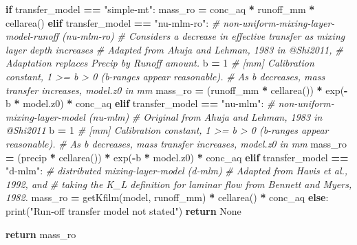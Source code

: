 \documentclass[]{article}
\newenvironment{Shaded}{\begin{snugshade}}{\end{snugshade}}
\newcommand{\DecValTok}[1]{\textcolor[rgb]{0.00,0.00,0.81}{{#1}}}
\newcommand{\StringTok}[1]{\textcolor[rgb]{0.31,0.60,0.02}{{#1}}}
\newcommand{\CommentTok}[1]{\textcolor[rgb]{0.56,0.35,0.01}{\textit{{#1}}}}
\newcommand{\VariableTok}[1]{\textcolor[rgb]{0.00,0.00,0.00}{{#1}}}
\newcommand{\ControlFlowTok}[1]{\textcolor[rgb]{0.13,0.29,0.53}{\textbf{{#1}}}}
\newcommand{\OperatorTok}[1]{\textcolor[rgb]{0.81,0.36,0.00}{\textbf{{#1}}}}
\newcommand{\BuiltInTok}[1]{{#1}}
\newcommand{\NormalTok}[1]{{#1}}
\begin{document}
\begin{Shaded}
\begin{Highlighting}[]
    \ControlFlowTok{if} \NormalTok{transfer_model }\OperatorTok{==} \StringTok{"simple-mt"}\NormalTok{:}
        \NormalTok{mass_ro }\OperatorTok{=} \NormalTok{conc_aq }\OperatorTok{*} \NormalTok{runoff_mm }\OperatorTok{*} \NormalTok{cellarea()}
    \ControlFlowTok{elif} \NormalTok{transfer_model }\OperatorTok{==} \StringTok{"nu-mlm-ro"}\NormalTok{:}
        \CommentTok{# non-uniform-mixing-layer-model-runoff (nu-mlm-ro)}
        \CommentTok{# Considers a decrease in effective transfer as mixing layer depth increases}
        \CommentTok{# Adapted from Ahuja and Lehman, 1983 in @Shi2011,}
        \CommentTok{# Adaptation replaces Precip by Runoff amount.}
        \NormalTok{b }\OperatorTok{=} \DecValTok{1}  \CommentTok{# [mm] Calibration constant, 1 >= b > 0 (b-ranges appear reasonable).}
        \CommentTok{# As b decreases, mass transfer increases, model.z0 in mm}
        \NormalTok{mass_ro }\OperatorTok{=} \NormalTok{(runoff_mm }\OperatorTok{*} \NormalTok{cellarea()) }\OperatorTok{*} \NormalTok{exp(}\OperatorTok{-}\NormalTok{b }\OperatorTok{*} \NormalTok{model.z0) }\OperatorTok{*} \NormalTok{conc_aq }
    \ControlFlowTok{elif} \NormalTok{transfer_model }\OperatorTok{==} \StringTok{"nu-mlm"}\NormalTok{:}
        \CommentTok{# non-uniform-mixing-layer-model (nu-mlm)}
        \CommentTok{# Original from Ahuja and Lehman, 1983 in @Shi2011}
        \NormalTok{b }\OperatorTok{=} \DecValTok{1}  \CommentTok{# [mm] Calibration constant, 1 >= b > 0 (b-ranges appear reasonable).}
        \CommentTok{# As b decreases, mass transfer increases, model.z0 in mm}
        \NormalTok{mass_ro }\OperatorTok{=} \NormalTok{(precip }\OperatorTok{*} \NormalTok{cellarea()) }\OperatorTok{*} \NormalTok{exp(}\OperatorTok{-}\NormalTok{b }\OperatorTok{*} \NormalTok{model.z0) }\OperatorTok{*} \NormalTok{conc_aq}
    \ControlFlowTok{elif} \NormalTok{transfer_model }\OperatorTok{==} \StringTok{"d-mlm"}\NormalTok{:}
        \CommentTok{# distributed mixing-layer-model (d-mlm)}
        \CommentTok{# Adapted from Havis et al., 1992, and}
        \CommentTok{# taking the K_L definition for laminar flow from Bennett and Myers, 1982.}
        \NormalTok{mass_ro }\OperatorTok{=} \NormalTok{getKfilm(model, runoff_mm) }\OperatorTok{*} \NormalTok{cellarea() }\OperatorTok{*} \NormalTok{conc_aq  }
    \ControlFlowTok{else}\NormalTok{:}
        \BuiltInTok{print}\NormalTok{(}\StringTok{"Run-off transfer model not stated"}\NormalTok{)}
        \ControlFlowTok{return} \VariableTok{None}

    \ControlFlowTok{return} \NormalTok{mass_ro}
\end{Highlighting}
\end{Shaded}
\end{document}
